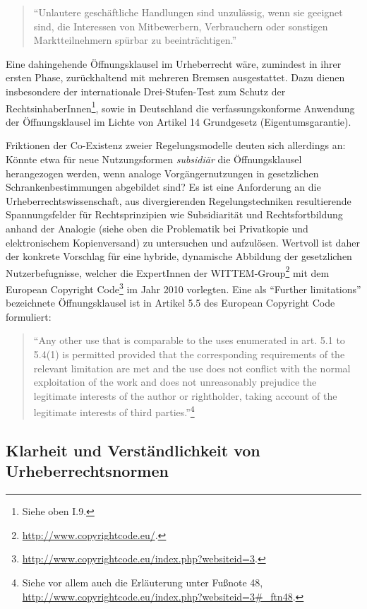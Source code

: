 \documentclass[output=paper]{langscibook}
\begin{document}
\begin{quote}
\enquote{Unlautere geschäftliche Handlungen sind unzulässig, wenn sie
geeignet sind, die Interessen von Mitbewerbern, Verbrauchern oder
sonstigen Marktteilnehmern spürbar zu beeinträchtigen.}
\end{quote}

\noindent Eine dahingehende Öffnungsklausel im Urheberrecht wäre, zumindest in
ihrer ersten Phase, zurückhaltend mit mehreren Bremsen ausgestattet.
Dazu dienen insbesondere der internationale Drei-Stufen-Test zum Schutz
der RechtsinhaberInnen\footnote{Siehe oben I.9.}, sowie in Deutschland die
verfassungskonforme Anwendung der Öffnungsklausel im Lichte von Artikel 14
Grundgesetz (Eigentumsgarantie).

Friktionen der Co-Existenz zweier Regelungsmodelle deuten sich
allerdings an: Könnte etwa für neue Nutzungsformen \emph{subsidiär} die
Öffnungsklausel herangezogen werden, wenn analoge Vorgängernutzungen in
gesetzlichen Schrankenbestimmungen abgebildet sind? Es ist eine
Anforderung an die Urheberrechtswissenschaft, aus divergierenden
Regelungstechniken resultierende Spannungsfelder für Rechtsprinzipien
wie Subsidiarität und Rechtsfortbildung anhand der Analogie (siehe oben die
Problematik bei Privatkopie und elektronischem Kopienversand) zu
untersuchen und aufzulösen. Wertvoll ist daher der konkrete Vorschlag
für eine hybride, dynamische Abbildung der gesetzlichen
Nutzerbefugnisse, welcher die ExpertInnen der WITTEM-Group\footnote{\url{http://www.copyrightcode.eu/}.}
mit dem European Copyright Code\footnote{\url{http://www.copyrightcode.eu/index.php?websiteid=3}.}
im Jahr 2010 vorlegten. Eine als \enquote{Further limitations}
bezeichnete Öffnungsklausel ist in Artikel 5.5 des European Copyright
Code formuliert:

\begin{quote}
\enquote{Any other use that is comparable to the uses enumerated in art.
5.1 to 5.4(1) is permitted provided that the corresponding requirements
of the relevant limitation are met and the use does not conflict with
the normal exploitation of the work and does not unreasonably prejudice
the legitimate interests of the author or rightholder, taking account of
the legitimate interests of third parties.}\footnote{Siehe vor allem
  auch die Erläuterung unter Fußnote 48,
  \url{http://www.copyrightcode.eu/index.php?websiteid=3\#_ftn48}.}
\end{quote}

\hypertarget{klarheit-und-verstuxe4ndlichkeit-von-urheberrechtsnormen}{%
\subsection{Klarheit und Verständlichkeit von
Urheberrechtsnormen}\label{klarheit-und-verstuxe4ndlichkeit-von-urheberrechtsnormen}}
\end{document}
